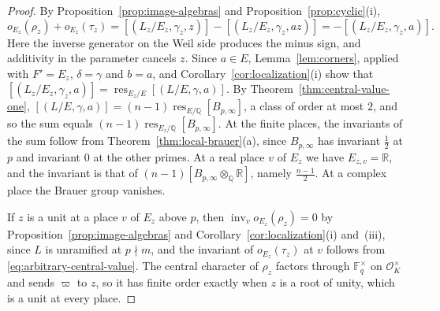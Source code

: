 \documentclass[a4paper,11pt]{amsart}
\theoremstyle{definition}
\theoremstyle{remark}
\numberwithin{equation}{section}
\newcommand{\Q}{\mathbb{Q}}
\DeclareMathOperator{\inv}{inv}
\DeclareMathOperator{\res}{res}
\newcommand{\F}{\mathbb{F}}
\newcommand{\R}{\mathbb{R}}
\newcommand{\OO}{\mathcal{O}}
\begin{document}
\begin{proof}
By Proposition~\ref{prop:image-algebras} and Proposition~\ref{prop:cyclic}(i),
\[
 o_{E_z}(\rho_z)+o_{E_z}(\tau_z)=[(L_z/E_z,\gamma_z,z)]-[(L_z/E_z,\gamma_z,az)]=-[(L_z/E_z,\gamma_z,a)].
\]
Here the inverse generator on the Weil side produces the minus sign, and additivity in the parameter cancels $z$. Since $a\in E$, Lemma~\ref{lem:corners}, applied with $F'=E_z$, $\delta=\gamma$ and $b=a$, and Corollary~\ref{cor:localization}(i) show that $[(L_z/E_z,\gamma_z,a)]=\res_{E_z/E}[(L/E,\gamma,a)]$. By Theorem~\ref{thm:central-value-one}, $[(L/E,\gamma,a)]=(n-1)\res_{E/\Q}[B_{p,\infty}]$, a class of order at most $2$, and so the sum equals $(n-1)\res_{E_z/\Q}[B_{p,\infty}]$. At the finite places, the invariants of the sum follow from Theorem~\ref{thm:local-brauer}(a), since $B_{p,\infty}$ has invariant $\frac12$ at $p$ and invariant $0$ at the other primes. At a real place $v$ of $E_z$ we have $E_{z,v}=\R$, and the invariant is that of $(n-1)[B_{p,\infty}\otimes_\Q\R]$, namely $\frac{n-1}2$. At a complex place the Brauer group vanishes.

If $z$ is a unit at a place $v$ of $E_z$ above $p$, then $\inv_v o_{E_z}(\rho_z)=0$ by Proposition~\ref{prop:image-algebras} and Corollary~\ref{cor:localization}(i) and~(iii), since $L$ is unramified at $p\nmid m$, and the invariant of $o_{E_z}(\tau_z)$ at $v$ follows from \eqref{eq:arbitrary-central-value}. The central character of $\rho_z$ factors through $\F_q^\times$ on $\OO_K^\times$ and sends $\varpi$ to $z$, so it has finite order exactly when $z$ is a root of unity, which is a unit at every place.
\end{proof}
\end{document}
